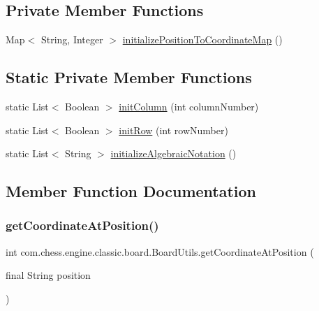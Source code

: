 \subsection*{Private Member Functions}
\begin{DoxyCompactItemize}
\item 
Map$<$ String, Integer $>$ \mbox{\hyperlink{enumcom_1_1chess_1_1engine_1_1classic_1_1board_1_1_board_utils_a77b348bf1e79db761e1e96e5de3d238f}{initialize\+Position\+To\+Coordinate\+Map}} ()
\end{DoxyCompactItemize}
\subsection*{Static Private Member Functions}
\begin{DoxyCompactItemize}
\item 
static List$<$ Boolean $>$ \mbox{\hyperlink{enumcom_1_1chess_1_1engine_1_1classic_1_1board_1_1_board_utils_a93ed19969015a1b866999ea08fa43cb3}{init\+Column}} (int column\+Number)
\item 
static List$<$ Boolean $>$ \mbox{\hyperlink{enumcom_1_1chess_1_1engine_1_1classic_1_1board_1_1_board_utils_a00765a9cb8974e6e54dfa2cb25de687b}{init\+Row}} (int row\+Number)
\item 
static List$<$ String $>$ \mbox{\hyperlink{enumcom_1_1chess_1_1engine_1_1classic_1_1board_1_1_board_utils_a32d498ecee277f23032f5df8ff25cedd}{initialize\+Algebraic\+Notation}} ()
\end{DoxyCompactItemize}


\subsection{Member Function Documentation}
\mbox{\label{enumcom_1_1chess_1_1engine_1_1classic_1_1board_1_1_board_utils_acf917640c591cfc0cec01d15908ae6bf}} 
\subsubsection{\texorpdfstring{getCoordinateAtPosition()}{getCoordinateAtPosition()}}
{\footnotesize\ttfamily int com.\+chess.\+engine.\+classic.\+board.\+Board\+Utils.\+get\+Coordinate\+At\+Position (\begin{DoxyParamCaption}\item[{final String}]{position }\end{DoxyParamCaption})}

